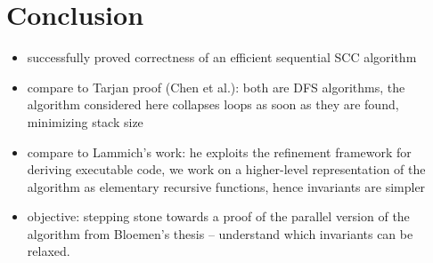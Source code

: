 \documentclass[sigplan,10pt,anonymous,review]{acmart}
\begin{document}
\section{Conclusion}
\label{sec:conclusion}

\begin{itemize}
\item successfully proved correctness of an efficient sequential SCC algorithm
\item compare to Tarjan proof (Chen et al.): both are DFS algorithms, the algorithm considered here collapses loops as soon as they are found, minimizing stack size
\item compare to Lammich's work: he exploits the refinement framework for deriving executable code, we work on a higher-level representation of the algorithm as elementary recursive functions, hence invariants are simpler
\item objective: stepping stone towards a proof of the parallel version of the algorithm from Bloemen's thesis -- understand which invariants can be relaxed.
\end{itemize}




\end{document}
